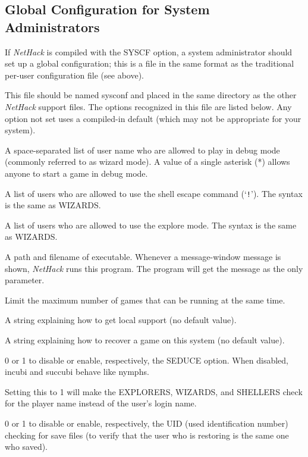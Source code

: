 \documentclass[titlepage]{article}
\begin{document}
\subsection*{Global Configuration for System Administrators}

If \textit{NetHack} is compiled with the SYSCF option, a system administrator
should set up a global configuration; this is a file in the
same format as the traditional per-user configuration file (see above).

This file should be named sysconf and placed in the same directory as
the other \textit{NetHack} support files.
The options recognized in this file are listed below. Any option not
set uses a compiled-in default (which may not be appropriate for your
system).

\begin{description}[font=\mdseries\itshape]
\item[WIZARDS]
A space-separated list of user name who are allowed to
play in debug mode (commonly referred to as wizard mode).
A value of a single
asterisk (*) allows anyone to start a game in debug mode.
\item[SHELLERS]
A list of users who are allowed to use the shell escape command (`\texttt{!}').
The syntax is the same as WIZARDS.
\item[EXPLORERS]
A list of users who are allowed to use the explore mode.
The syntax is the same as WIZARDS.
\item[MSGHANDLER]
A path and filename of executable.  Whenever a message-window
message is shown, \textit{NetHack} runs this program.  The program will get
the message as the only parameter.
\item[MAXPLAYERS]
Limit the maximum number of games that can be running at the same time.
\item[SUPPORT]
A string explaining how to get local support (no default value).
\item[RECOVER]
A string explaining how to recover a game on this system (no default value).
\item[SEDUCE]
0 or 1 to disable or enable, respectively, the SEDUCE option.
When disabled, incubi and succubi behave like nymphs.
\item[CHECK\textunderscore PLNAME]
Setting this to 1 will make the EXPLORERS, WIZARDS, and SHELLERS check
for the player name instead of the user's login name.
\item[CHECK\textunderscore SAVE\textunderscore UID]
0 or 1 to disable or enable, respectively, the UID
(used identification number) checking for save files (to verify that the
user who is restoring is the same one who saved).
\end{description}
\end{document}
